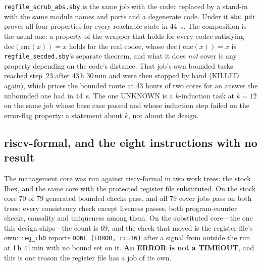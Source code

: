 \documentclass[11pt,a4paper]{article}
\newcommand{\file}[1]{\texttt{\small #1}}
\begin{document}
\file{regfile\_scrub\_abs.sby} is the same job with the codec replaced
by a stand-in with the same module names and ports and a degenerate
code. Under it \texttt{abc pdr} proves all four properties for every
reachable state in \SI{44}{\second}. The composition is the usual one:
a property of the wrapper that holds for every codec satisfying
$\mathrm{dec}(\mathrm{enc}(x)) = x$ holds for the real codec, whose
$\mathrm{dec}(\mathrm{enc}(x)) = x$ is \file{regfile\_secded.sby}'s
separate theorem, and what it does \emph{not} cover is any property
depending on the code's distance. That job's own bounded tasks reached
step~23 after \num{43}\,h \num{30}\,min and were then stopped by hand
(KILLED again), which prices the bounded route at \num{43} hours of two
cores for an answer the unbounded one had in \SI{44}{\second}. The one
UNKNOWN is a $k$-induction task at $k = 12$ on the same job whose base
case passed and whose induction step failed on the error-flag property:
a statement about $k$, not about the design.

\subsection{riscv-formal, and the eight instructions with no result}

The management core was run against riscv-formal in two work trees: the
stock Ibex, and the same core with the protected register file
substituted. On the stock core \num{70} of \num{79} generated bounded
checks pass, and all \num{79} cover jobs pass on both trees; every
consistency check except liveness passes, both program-counter checks,
causality and uniqueness among them. On the substituted core---the one
this design ships---the count is \num{69}, and the check that moved is
the register file's own: \texttt{reg\_ch0} reports
\texttt{DONE}\allowbreak\ \texttt{(ERROR,}\allowbreak\ \texttt{rc=16)}
after a signal from outside the run at \num{1}\,h \num{41}\,min with no
bound set on it. \textbf{An ERROR is not a TIMEOUT}, and this is one
reason the register file has a job of its own.
\end{document}
